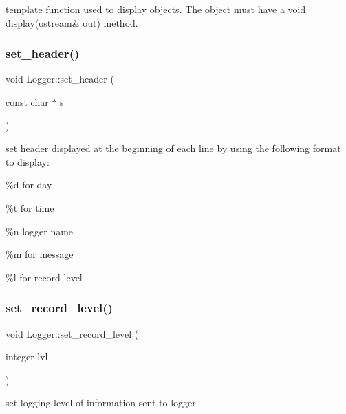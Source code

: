 template function used to display objects. The object must have a void display(ostream\& out) method. \mbox{\label{classez_1_1logging_1_1Logger_a2845727c27243d47fefbd9d65df5bd6b}} 
\subsubsection{\texorpdfstring{set\+\_\+header()}{set\_header()}}
{\footnotesize\ttfamily void Logger\+::set\+\_\+header (\begin{DoxyParamCaption}\item[{const char $\ast$}]{s }\end{DoxyParamCaption})}

set header displayed at the beginning of each line by using the following format to display\+: 
\begin{DoxyItemize}
\item \%{\ttfamily d} for day 
\item \%{\ttfamily t} for time 
\item \%{\ttfamily n} logger name 
\item \%{\ttfamily m} for message 
\item \%{\ttfamily l} for record level 
\end{DoxyItemize}\mbox{\label{classez_1_1logging_1_1Logger_a64bfdfc5a20a7ee660144c50dfd0514e}} 
\subsubsection{\texorpdfstring{set\+\_\+record\+\_\+level()}{set\_record\_level()}}
{\footnotesize\ttfamily void Logger\+::set\+\_\+record\+\_\+level (\begin{DoxyParamCaption}\item[{integer}]{lvl }\end{DoxyParamCaption})\hspace{0.3cm}{\ttfamily [virtual]}}

set logging level of information sent to logger 

